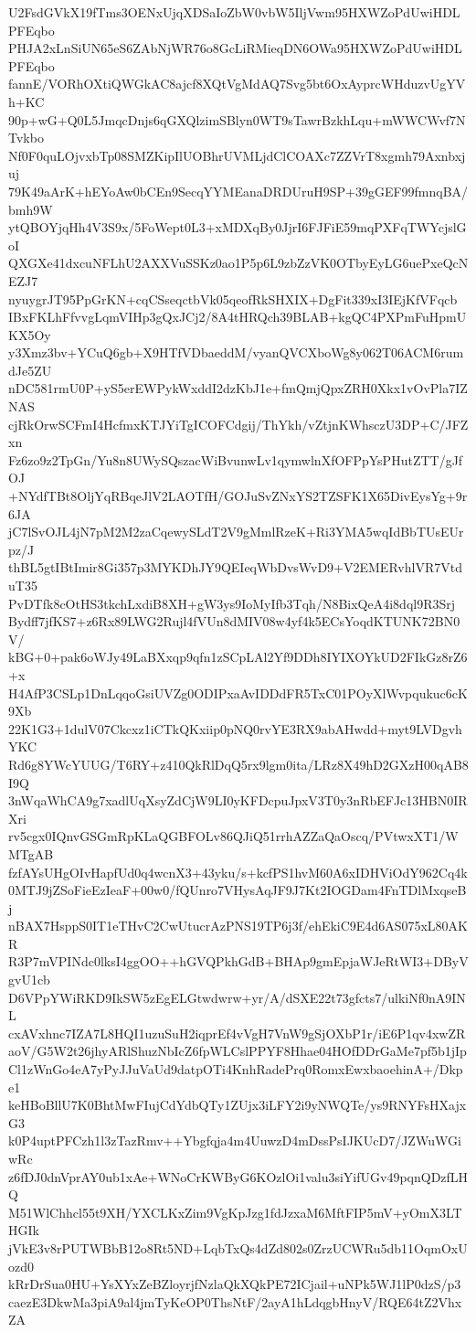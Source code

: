 U2FsdGVkX19fTms3OENxUjqXDSaIoZbW0vbW5IljVwm95HXWZoPdUwiHDLPFEqbo
PHJA2xLnSiUN65eS6ZAbNjWR76o8GcLiRMieqDN6OWa95HXWZoPdUwiHDLPFEqbo
fannE/VORhOXtiQWGkAC8ajcf8XQtVgMdAQ7Svg5bt6OxAyprcWHduzvUgYVh+KC
90p+wG+Q0L5JmqcDnjs6qGXQlzimSBlyn0WT9sTawrBzkhLqu+mWWCWvf7NTvkbo
Nf0F0quLOjvxbTp08SMZKipIlUOBhrUVMLjdClCOAXc7ZZVrT8xgmh79Axnbxjuj
79K49aArK+hEYoAw0bCEn9SecqYYMEanaDRDUruH9SP+39gGEF99fmnqBA/bmh9W
ytQBOYjqHh4V3S9x/5FoWept0L3+xMDXqBy0JjrI6FJFiE59mqPXFqTWYcjslGoI
QXGXe41dxcuNFLhU2AXXVuSSKz0ao1P5p6L9zbZzVK0OTbyEyLG6uePxeQcNEZJ7
nyuygrJT95PpGrKN+cqCSseqctbVk05qeofRkSHXIX+DgFit339xI3IEjKfVFqcb
IBxFKLhFfvvgLqmVIHp3gQxJCj2/8A4tHRQch39BLAB+kgQC4PXPmFuHpmUKX5Oy
y3Xmz3bv+YCuQ6gb+X9HTfVDbaeddM/vyanQVCXboWg8y062T06ACM6rumdJe5ZU
nDC581rmU0P+yS5erEWPykWxddI2dzKbJ1e+fmQmjQpxZRH0Xkx1vOvPla7IZNAS
cjRkOrwSCFmI4HcfmxKTJYiTgICOFCdgij/ThYkh/vZtjnKWhsczU3DP+C/JFZxn
Fz6zo9z2TpGn/Yu8n8UWySQszacWiBvunwLv1qymwlnXfOFPpYsPHutZTT/gJfOJ
+NYdfTBt8OljYqRBqeJlV2LAOTfH/GOJuSvZNxYS2TZSFK1X65DivEysYg+9r6JA
jC7lSvOJL4jN7pM2M2zaCqewySLdT2V9gMmlRzeK+Ri3YMA5wqIdBbTUsEUrpz/J
thBL5gtIBtImir8Gi357p3MYKDhJY9QEIeqWbDvsWvD9+V2EMERvhlVR7VtduT35
PvDTfk8cOtHS3tkchLxdiB8XH+gW3ys9IoMyIfb3Tqh/N8BixQeA4i8dql9R3Srj
Bydff7jfKS7+z6Rx89LWG2Rujl4fVUn8dMIV08w4yf4k5ECsYoqdKTUNK72BN0V/
kBG+0+pak6oWJy49LaBXxqp9qfn1zSCpLAl2Yf9DDh8IYIXOYkUD2FIkGz8rZ6+x
H4AfP3CSLp1DnLqqoGsiUVZg0ODIPxaAvIDDdFR5TxC01POyXlWvpqukuc6cK9Xb
22K1G3+1dulV07Ckcxz1iCTkQKxiip0pNQ0rvYE3RX9abAHwdd+myt9LVDgvhYKC
Rd6g8YWcYUUG/T6RY+z410QkRlDqQ5rx9lgm0ita/LRz8X49hD2GXzH00qAB8I9Q
3nWqaWhCA9g7xadlUqXsyZdCjW9LI0yKFDcpuJpxV3T0y3nRbEFJc13HBN0IRXri
rv5cgx0IQnvGSGmRpKLaQGBFOLv86QJiQ51rrhAZZaQaOscq/PVtwxXT1/WMTgAB
fzfAYsUHgOIvHapfUd0q4wcnX3+43yku/s+kcfPS1hvM60A6xIDHViOdY962Cq4k
0MTJ9jZSoFieEzIeaF+00w0/fQUnro7VHysAqJF9J7Kt2IOGDam4FnTDlMxqseBj
nBAX7HsppS0IT1eTHvC2CwUtucrAzPNS19TP6j3f/ehEkiC9E4d6AS075xL80AKR
R3P7mVPINdc0lksI4ggOO++hGVQPkhGdB+BHAp9gmEpjaWJeRtWI3+DByVgvU1cb
D6VPpYWiRKD9IkSW5zEgELGtwdwrw+yr/A/dSXE22t73gfcts7/ulkiNf0nA9INL
cxAVxhnc7IZA7L8HQI1uzuSuH2iqprEf4vVgH7VnW9gSjOXbP1r/iE6P1qv4xwZR
aoV/G5W2t26jhyARlShuzNbIcZ6fpWLCslPPYF8Hhae04HOfDDrGaMe7pf5b1jIp
Cl1zWnGo4eA7yPyJJuVaUd9datpOTi4KnhRadePrq0RomxEwxbaoehinA+/Dkpe1
keHBoBllU7K0BhtMwFIujCdYdbQTy1ZUjx3iLFY2i9yNWQTe/ys9RNYFsHXajxG3
k0P4uptPFCzh1l3zTazRmv++Ybgfqja4m4UuwzD4mDssPsIJKUcD7/JZWuWGiwRc
z6fDJ0dnVprAY0ub1xAe+WNoCrKWByG6KOzlOi1valu3siYifUGv49pqnQDzfLHQ
M51WlChhcl55t9XH/YXCLKxZim9VgKpJzg1fdJzxaM6MftFIP5mV+yOmX3LTHGIk
jVkE3v8rPUTWBbB12o8Rt5ND+LqbTxQs4dZd802s0ZrzUCWRu5db11OqmOxUozd0
kRrDrSua0HU+YsXYxZeBZloyrjfNzlaQkXQkPE72ICjail+uNPk5WJ1lP0dzS/p3
caezE3DkwMa3piA9al4jmTyKeOP0ThsNtF/2ayA1hLdqgbHnyV/RQE64tZ2VhxZA
